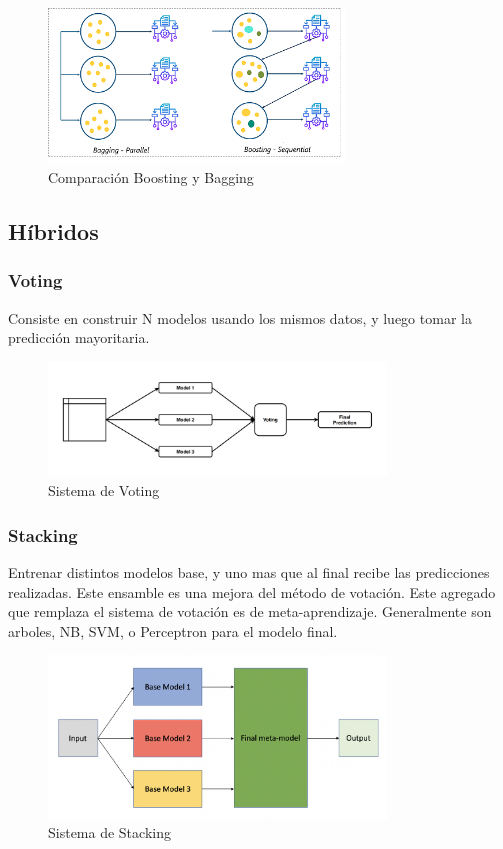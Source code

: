 \documentclass[titlepage,a4paper]{article}
\begin{document}
\begin{figure}[!htb]
    \centering
    \includegraphics[width=0.7\textwidth]{imagenesResumen/Boosting.png}
    \caption{Comparación Boosting y Bagging}
\end{figure}

\subsection{Híbridos}
\subsubsection{Voting}
Consiste en construir N modelos usando los mismos datos, y luego tomar la predicción mayoritaria.

\begin{figure}[!htb]
    \centering
    \includegraphics[width=0.8\textwidth]{imagenesResumen/Voting.png}
    \caption{Sistema de Voting}
\end{figure}

\subsubsection{Stacking}
Entrenar distintos modelos base, y uno mas que al final recibe las predicciones realizadas. Este ensamble es una mejora del método de votación. Este agregado que remplaza el sistema de votación es de meta-aprendizaje. Generalmente son arboles, NB, SVM, o Perceptron para el modelo final.

\begin{figure}[!htb]
    \centering
    \includegraphics[width=0.8\textwidth]{imagenesResumen/Stacking.png}
    \caption{Sistema de Stacking}
\end{figure}
\end{document}
